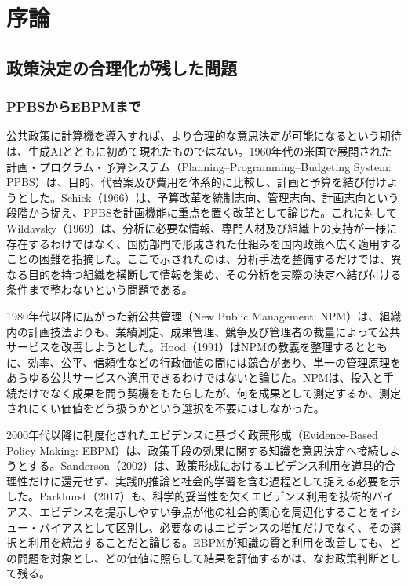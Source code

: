 
\chapter{序論}
\label{chap:introduction}

\section{政策決定の合理化が残した問題}
\label{sec:intro_rationalization_problem}

\subsection{PPBSからEBPMまで}
\label{subsec:intro_ppbs_to_ebpm}

公共政策に計算機を導入すれば、より合理的な意思決定が可能になるという期待は、生成AIとともに初めて現れたものではない。1960年代の米国で展開された計画・プログラム・予算システム（Planning--Programming--Budgeting System: PPBS）は、目的、代替案及び費用を体系的に比較し、計画と予算を結び付けようとした。Schick（1966）は、予算改革を統制志向、管理志向、計画志向という段階から捉え、PPBSを計画機能に重点を置く改革として論じた\cite{schick1966ppb}。これに対してWildavsky（1969）は、分析に必要な情報、専門人材及び組織上の支持が一様に存在するわけではなく、国防部門で形成された仕組みを国内政策へ広く適用することの困難を指摘した\cite{wildavsky1969ppbs}。ここで示されたのは、分析手法を整備するだけでは、異なる目的を持つ組織を横断して情報を集め、その分析を実際の決定へ結び付ける条件まで整わないという問題である。

1980年代以降に広がった新公共管理（New Public Management: NPM）は、組織内の計画技法よりも、業績測定、成果管理、競争及び管理者の裁量によって公共サービスを改善しようとした。Hood（1991）はNPMの教義を整理するとともに、効率、公平、信頼性などの行政価値の間には競合があり、単一の管理原理をあらゆる公共サービスへ適用できるわけではないと論じた\cite{hood1991npm}。NPMは、投入と手続だけでなく成果を問う契機をもたらしたが、何を成果として測定するか、測定されにくい価値をどう扱うかという選択を不要にはしなかった。

2000年代以降に制度化されたエビデンスに基づく政策形成（Evidence-Based Policy Making: EBPM）は、政策手段の効果に関する知識を意思決定へ接続しようとする。Sanderson（2002）は、政策形成におけるエビデンス利用を道具的合理性だけに還元せず、実践的推論と社会的学習を含む過程として捉える必要を示した\cite{sanderson2002evidence}。Parkhurst（2017）も、科学的妥当性を欠くエビデンス利用を技術的バイアス、エビデンスを提示しやすい争点が他の社会的関心を周辺化することをイシュー・バイアスとして区別し、必要なのはエビデンスの増加だけでなく、その選択と利用を統治することだと論じる\cite{parkhurst2017politics}。EBPMが知識の質と利用を改善しても、どの問題を対象とし、どの価値に照らして結果を評価するかは、なお政策判断として残る。

